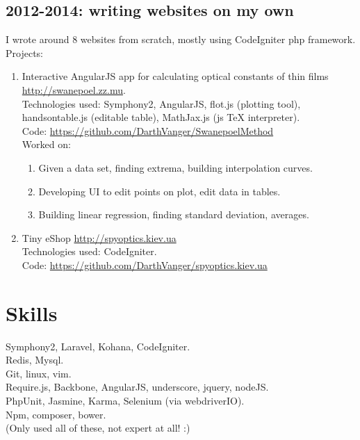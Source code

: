 \documentclass[a4paper, 14pt]{article}
\begin{document}
	\subsection{2012-2014: writing websites on my own}
	I wrote around 8 websites from scratch, mostly using CodeIgniter php framework. \\
    Projects:
        \begin{enumerate}
            \item Interactive AngularJS app for calculating optical constants of thin films \\
            \url{http://swanepoel.zz.mu}. \\
            Technologies used: Symphony2, AngularJS, flot.js (plotting tool), handsontable.js (editable table), MathJax.js (js TeX interpreter). \\
            Code: \url{https://github.com/DarthVanger/SwanepoelMethod} \\
            Worked on:
            \begin{enumerate}
                \item Given a data set, finding extrema, building interpolation curves.
                \item Developing UI to edit points on plot, edit data in tables.
                \item Building linear regression, finding standard deviation, averages.
            \end{enumerate}

            \item Tiny eShop \url{http://spyoptics.kiev.ua} \\
            Technologies used: CodeIgniter. \\
            Code: \url{https://github.com/DarthVanger/spyoptics.kiev.ua}
        \end{enumerate}

      
\section{Skills}
    Symphony2, Laravel, Kohana, CodeIgniter. \\
    Redis, Mysql. \\
	Git, linux, vim. \\
    Require.js, Backbone, AngularJS, underscore, jquery, nodeJS. \\
    PhpUnit, Jasmine, Karma, Selenium (via webdriverIO). \\
    Npm, composer, bower. \\
    (Only used all of these, not expert at all! :) 
\end{document}
